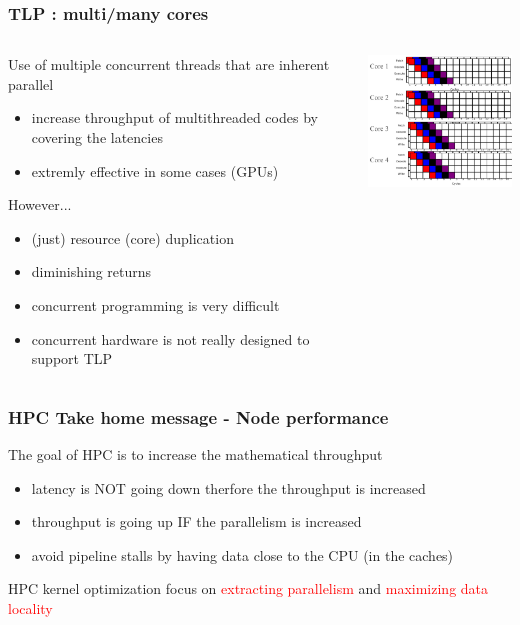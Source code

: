 \begin{frame}[containsverbatim]
\frametitle{TLP : multi/many cores}
\begin{columns}[c]
	\begin{column}{5cm}
{\footnotesize
	Use of multiple concurrent threads that are inherent parallel
	\begin{itemize}
	\item increase throughput of multithreaded codes by covering the latencies
	\item extremly effective in some cases (GPUs)
	\end{itemize}
	However...
	\begin{itemize}
	\item (just) resource (core) duplication
	\item diminishing returns
	\item concurrent programming is very difficult
	\item concurrent hardware is not really designed to support TLP
	\end{itemize}
}
	\end{column} 
	\begin{column}{5cm}
	\includegraphics[width=5cm]{DayGilles/images/pipeline-multicores.jpg}
	\end{column}
\end{columns} 
\end{frame}


\begin{frame}[containsverbatim]
\frametitle{HPC Take home message - Node performance}
The goal of HPC is to increase the mathematical throughput
\vfill
\begin{itemize}
\item latency is NOT going down therfore the throughput is increased 
\item throughput is going up IF the parallelism is increased
\item avoid pipeline stalls by having data close to the CPU (in the caches)
\end{itemize}
\vfill
HPC kernel optimization focus on \textcolor{red}{extracting parallelism} and \textcolor{red}{maximizing data locality}
\end{frame}



